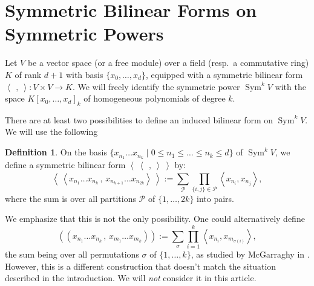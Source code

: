 \documentclass{amsart}
\DeclareMathOperator{\Sym}{Sym}
\newcommand{\coloneqq}{:=}
\newcommand{\bra}{\left<\!\!\!\:\left<}
\newcommand{\ket}{\right>\!\!\!\:\right>}
\theoremstyle{plain}
\theoremstyle{definition}
\newtheorem{definition}[theorem]{Definition}
\theoremstyle{remark}
\begin{document}
\section{Symmetric Bilinear Forms on Symmetric Powers} \label{symSection}
Let $V$ be a vector space (or a free module) over a field (resp.~a commutative ring) $K$ of rank $d+1$ with basis $\{x_0,\ldots,x_{d}\}$, equipped with a symmetric bilinear form $\left<\,\ ,\ \right>: V\times V \rightarrow K$. We will freely identify the symmetric power $\Sym^kV$ with the space $K[x_0,\ldots,x_d]_k$ of homogeneous polynomials of degree $k$. 

There are at least two possibilities to define an induced bilinear form on $\Sym^kV$. We will use the following
\begin{definition} \label{formdef} On the basis $\{x_{n_1}\ldots x_{n_k}\;|\;0\leq n_1\leq\ldots\leq n_k\leq d\}$ of $\Sym^kV$, we define a symmetric bilinear form $\bra\ \,,\ \ket$ by: 
\begin{equation}
\label{mydef}
\bra x_{n_1}\ldots x_{n_k}\,,\,x_{n_{k+1}}\ldots x_{n_{2k}} \ket \coloneqq \sum_{\mathcal{P}} \prod_{\{i,j\}\in\mathcal{P}} \left<x_{n_i},x_{n_j}\right>,
\end{equation}
where the sum is over all partitions $\mathcal{P}$ of $\{1,\ldots,2k\}$ into pairs.
\end{definition}

We emphasize that this is not the only possibility. One could alternatively define
\begin{equation}\label{Garr}
\left(\!\left( x_{n_1}\ldots x_{n_k}\,,\, x_{m_1}\ldots x_{m_k}\right)\!\right) \coloneqq \sum_\sigma  
\prod_{i=1}^k \left< x_{n_i},x_{m_{\sigma(i)}}\right>,
\end{equation}
the sum being over all permutations $\sigma$ of $\{1,\ldots,k\}$, as studied by McGarraghy in \cite{McGarr}. However, this is a different construction that doesn't match the situation described in the introduction. We will \emph{not} consider it in this article.
\end{document}
